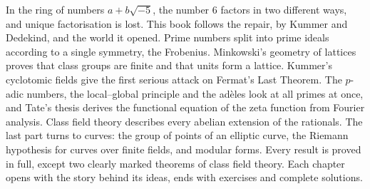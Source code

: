In the ring of numbers $a+b\sqrt{-5}$, the number $6$ factors in two different ways, and unique factorisation is lost.
This book follows the repair, by Kummer and Dedekind, and the world it opened. Prime numbers split into prime ideals
according to a single symmetry, the Frobenius. Minkowski's geometry of lattices proves that class groups are finite and
that units form a lattice. Kummer's cyclotomic fields give the first serious attack on Fermat's Last Theorem. The $p$-adic
numbers, the local--global principle and the ad\`eles look at all primes at once, and Tate's thesis derives the functional
equation of the zeta function from Fourier analysis. Class field theory describes every abelian extension of the rationals.
The last part turns to curves: the group of points of an elliptic curve, the Riemann hypothesis for curves over finite
fields, and modular forms. Every result is proved in full, except two clearly marked theorems of class field theory. Each
chapter opens with the story behind its ideas, ends with exercises and complete solutions.
